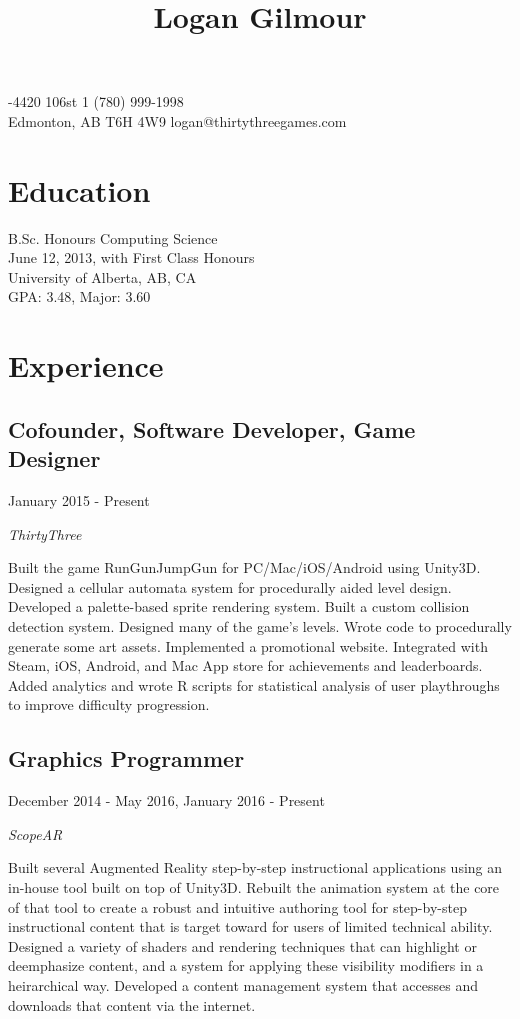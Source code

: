 \documentclass[10pt]{article}
\title{\bfseries\Large Logan Gilmour}
\author{}
\date{}
\begin{document}
\maketitle
{}-4420 106st \hfill 1 (780) 999-1998\\
Edmonton, AB  T6H 4W9 \hfill logan@thirtythreegames.com
\section*{Education}

B.Sc. Honours Computing Science\\
June 12, 2013, with First Class Honours\\
University of Alberta, AB, CA\\
GPA: 3.48, Major: 3.60

\section*{Experience}

\subsection*{Cofounder, Software Developer, Game Designer}
January 2015 - Present

\emph{ThirtyThree}
\vspace{\baselineskip}

Built the game RunGunJumpGun for PC/Mac/iOS/Android using Unity3D. Designed a cellular automata system for procedurally aided level design. Developed a palette-based sprite rendering system. Built a custom collision detection system. Designed many of the game's levels. Wrote code to procedurally generate some art assets. Implemented a promotional website. Integrated with Steam, iOS, Android, and Mac App store for achievements and leaderboards. Added analytics and wrote R scripts for statistical analysis of user playthroughs to improve difficulty progression.


\subsection*{Graphics Programmer}
December 2014 - May 2016, January 2016 - Present

\emph{ScopeAR}
\vspace{\baselineskip}

Built several Augmented Reality step-by-step instructional applications using an in-house tool built on top of Unity3D. Rebuilt the animation system at the core of that tool to create a robust and intuitive authoring tool for step-by-step instructional content that is target toward for users of limited technical ability. Designed a variety of shaders and rendering techniques that can highlight or deemphasize content, and a system for applying these visibility modifiers in a heirarchical way. Developed a content management system that accesses and downloads that content via the internet.
\end{document}
